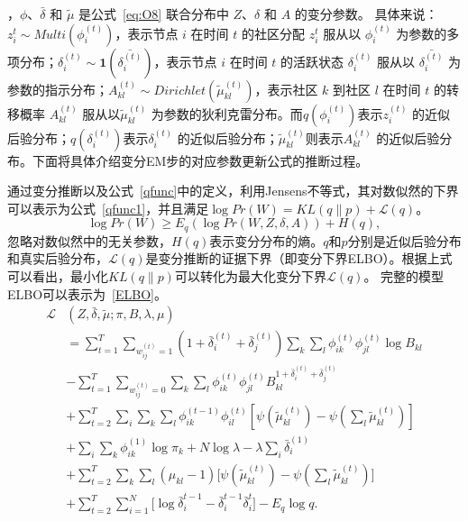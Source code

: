 ，$\phi$、$\bar{\delta}$ 和 $\tilde{\mu}$ 是公式~\ref{eq:O8} 联合分布中 $Z$、$\delta$ 和 $A$ 的变分参数。  
具体来说：$z_i^t \sim Multi(\phi_i^{(t)})$，表示节点 $i$ 在时间 $t$ 的社区分配 $z_i^t$ 服从以 $\phi_i^{(t)}$ 为参数的多项分布；$\delta_i^{(t)} \sim \mathbf{1}(\bar{\delta_i^{(t)}})$，表示节点 $i$ 在时间 $t$ 的活跃状态 $\delta_i^{(t)}$ 服从以 $\bar{\delta_i^{(t)}}$ 为参数的指示分布；$A_{kl}^{(t)} \sim Dirichlet(\tilde{\mu}_{kl}^{(t)})$，表示社区 $k$ 到社区 $l$ 在时间 $t$ 的转移概率 $A_{kl}^{(t)}$ 服从以$\tilde{\mu}_{kl}^{(t)}$ 为参数的狄利克雷分布。而$q(\phi_i^{(t)})$表示$z_i^{(t)}$ 的近似后验分布；$q(\delta_i^{(t)})$表示$\delta_i^{(t)}$ 的近似后验分布；$\tilde{\mu}_{kl}^{(t)}$则表示$A_{kl}^{(t)}$ 的近似后验分布。下面将具体介绍变分EM步的对应参数更新公式的推断过程。

通过变分推断以及公式~\ref{qfunc}中的定义，利用Jensens不等式，其对数似然的下界可以表示为公式~\ref{qfunc1}，并且满足$\log Pr(W) = KL(q \| p) + \mathscr{L}(q)$。  
\begin{equation}
\log Pr(W)\ge E_q(\log Pr(W, Z,\delta, A) ) + H(q),
\label{qfunc1}
\end{equation}
忽略对数似然中的无关参数，$H(q)$表示变分分布的熵。$q$和$p$分别是近似后验分布和真实后验分布，$\mathscr{L}(q)$是变分推断的证据下界（即变分下界ELBO）。根据上式可以看出，最小化$KL(q \| p)$可以转化为最大化变分下界$\mathscr{L}(q)$。  
完整的模型ELBO可以表示为~\ref{ELBO}。
\begin{align}
 \mathscr{L} & (Z,\bar{\delta},\tilde{\mu};\pi,B,\lambda,\mu) \nonumber \\
& = \sum_{t=1}^T \sum_{w_{ij}^{(t)}=1} (1+\bar{\delta}_i^{(t)}+\bar{\delta}_j^{(t)}) \sum_k \sum_l \phi_{ik}^{(t)}\phi_{jl}^{(t)} \log B_{kl} \nonumber\\
& -\sum_{t=1}^T \sum_{w_{ij}^{(t)}=0} \sum_k \sum_l \phi_{ik}^{(t)}\phi_{jl}^{(t)}  B_{kl}^{1+\bar{\delta}_i^{(t)}+\bar{\delta}_j^{(t)}} \nonumber\\
& +\sum_{t=2}^T \sum_i \sum_k \sum_l \phi_{ik}^{(t-1)}\phi_{il}^{(t)} [\psi(\tilde{\mu}_{kl}^{(t)}) - \psi(\sum_l \tilde{\mu}_{kl}^{(t)})]  \nonumber\\
& +\sum_i \sum_k \phi_{ik}^{(1)} \log \pi_k +  N\log \lambda -\lambda \sum_i \bar{\delta}_i^{(1)}  \nonumber \\
& +\sum_{t=2}^T \sum_k \sum_l(\mu_{kl} - 1) \Big[\psi(\tilde{\mu}_{kl}^{(t)}) - \psi(\sum_l \tilde{\mu}_{kl}^{(t)})\Big]  \nonumber\\
& + \sum_{t=2}^{T} \sum_{i=1}^N \big[\log \bar{\delta}_i^{t-1} - \bar{\delta}_i^{t-1} \bar{\delta}_i^{t}\big] -E_q \log q.
\label{ELBO}
\end{align}

